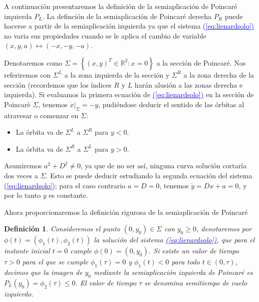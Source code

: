 \documentclass[12pt,a4paper]{report} %
\newtheorem{definicion}{Definición}[chapter]
\newcommand{\eref}[1]{\hyperref[#1]{\textcolor{blue}{(\ref*{#1})}}}
\begin{document}
		\vspace{0.5cm} A continuación presentaremos la definición de la semiaplicación de Poincaré izquierda $P_L$. La definción de la semiaplicación de Poincaré derecha $P_R$ puede hacerse a partir de la semiaplicación izquierda ya que el sistema \eref{eq:lienardsolo} no varia sus propiedades cuando se le aplica el cambio de variable $(x,y,a)\longleftrightarrow(-x,-y,-a)$. 
	
	\newpage
	
	Denotaremos como $\varSigma=\left\{(x,y)^T\in \mathbb{R}^2:x=0\right\}$ a la sección de Poincaré. Nos referiremos con $\varSigma^L$ a la zona izquierda de la sección y $\varSigma^R$ a la zona derecha de la sección (recordemos que los índices $R$ y $L$ harán alusión a las zonas derecha e izquierda). Si evaluamos la primera ecuación de \eref{eq:lienardsolo} en la sección de Poincarè $\varSigma$, tenemos $\dot{x}|_{\varSigma}=-y$, pudiéndose deducir el sentido de las órbitas al atravesar o comenzar en $\varSigma$:
	
	\begin{itemize}
		\item La órbita va de $\varSigma^L$ a $\varSigma^R$ para $y<0$.
		\item La órbita va de $\varSigma^R$ a $\varSigma^L$ para $y>0$.
	\end{itemize}
	
	\vspace{0.5cm}\noindent Asumiremos $a^2+D^2\neq0$, ya que de no ser así, ninguna curva solución cortaría dos veces a $\varSigma$. Esto se puede deducir estudiando la segunda ecuación del sistema \eref{eq:lienardsolo}; para el caso contrario $a=D=0$, tenemos $\dot{y}=Dx+a=0$, y por lo tanto $y$ es constante.
	
	\vspace{0.5cm}\noindent Ahora proporcionaremos la definición rigurosa de la semiaplicación de Poincaré

	\vspace{0.5cm}
	\begin{definicion}
		\label{def6}
		Consideremos el punto $(0,y_0)\in \varSigma$ con $y_0\geq0$, denotaremos por $\phi(t)=(\phi_1(t),\phi_2(t))$ la solución del sistema \eref{eq:lienardsolo}, que para el instante inicial $t=0$ cumple $\phi(0)=(0,y_0)$. Si existe un valor de tiempo $\tau>0$ para el que se cumple $\phi_1(\tau)=0$ y $\phi_1(t)<0$ para todo $t\in(0,\tau)$, decimos que la imagen de $y_0$ mediante la semiaplicación izquierda de Poincaré es $P_L(y_0)=\phi_2(\tau)\leq0$. El valor de tiempo $\tau$ se denomina semitiempo de vuelo izquierdo.
	\end{definicion}
	
\end{document}
